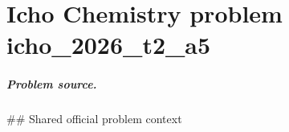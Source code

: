 
\chapter{Icho Chemistry problem icho\_2026\_t2\_a5}
\label{ch:IChO2026Problems_problem_icho_2026_t2_a5}

\paragraph{Problem source.}
\#\# Shared official problem context
